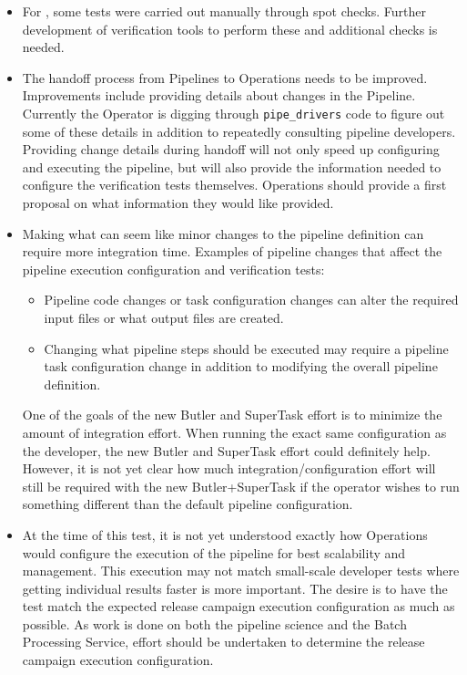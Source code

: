 \documentclass[DM,lsstdraft,STR,toc]{lsstdoc}
\begin{document}
\begin{itemize}

  \item{
    For \milestoneId{}, some tests were carried out manually through spot checks.
    Further development of verification tools to perform these and additional checks is needed.
  }

  \item{
    The handoff process from Pipelines to Operations needs to be improved.
    Improvements include providing details about changes in the Pipeline.
    Currently the Operator is digging through \texttt{pipe{\_}drivers} code to figure out some of these details in addition to repeatedly consulting pipeline developers.
  Providing change details during handoff will not only speed up configuring and executing the pipeline, but will also provide the information needed to configure the verification tests themselves.
    Operations should provide a first proposal on what information they would like provided.
  }

  \item{
    Making what can seem like minor changes to the pipeline definition can require more integration time.
    Examples of pipeline changes that affect the pipeline execution configuration and verification tests:

    \begin{itemize}

      \item{Pipeline code changes or task configuration changes can alter the required input files or what output files are created.}
      \item{Changing what pipeline steps should be executed may require a pipeline task configuration change in addition to modifying the overall pipeline definition.}

    \end{itemize}

    One of the goals of the new Butler and SuperTask effort is to minimize the amount of integration effort.
    When running the exact same configuration as the developer, the new Butler and SuperTask effort could definitely help.
    However, it is not yet clear how much integration/configuration effort will still be required with the new Butler+SuperTask if the operator wishes to run something different than the default pipeline configuration.
  }

  \item{
    At the time of this test, it is not yet understood exactly how Operations would configure the execution of the pipeline for best scalability and management.
    This execution may not match small-scale developer tests where getting individual results faster is more important.
    The desire is to have the test match the expected release campaign execution configuration
  as much as possible.
    As work is done on both the pipeline science and the Batch Processing Service, effort should be undertaken to determine the release campaign execution configuration.
  }

\end{itemize}
\end{document}
